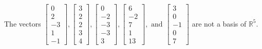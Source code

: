 \begin{exercise}
\begin{exerciseStatement}
  \end{exerciseStatement}
  \begin{exerciseAnswer}
   The vectors \(\left[\begin{array}{r}
0 \\
2 \\
-3 \\
1 \\
-1
\end{array}\right] , \left[\begin{array}{r}
3 \\
2 \\
2 \\
3 \\
4
\end{array}\right] , \left[\begin{array}{r}
0 \\
-2 \\
-3 \\
-3 \\
3
\end{array}\right] , \left[\begin{array}{r}
6 \\
-2 \\
7 \\
1 \\
13
\end{array}\right] , \text{ and } \left[\begin{array}{r}
3 \\
0 \\
-1 \\
0 \\
7
\end{array}\right]\) 
  	 are not  a basis of \(\mathbb{R}^5\).
  


  \end{exerciseAnswer}
\end{exercise}